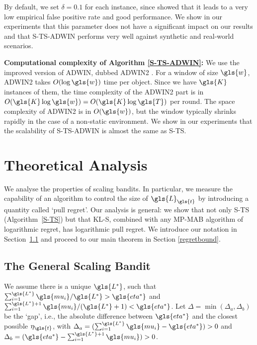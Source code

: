 By default, we set $\delta = 0.1$ for each instance, since \cite{DBLP:conf/sdm/BifetG07} showed that it leads to a very low empirical false positive rate and good performance. 
We show in our experiments that this parameter does not have a significant impact on our results and that S-TS-ADWIN performs very well against synthetic and real-world scenarios.  

\textbf{Computational complexity of Algorithm \ref{S-TS-ADWIN}:} We use the improved version of \gls{ADWIN}, dubbed ADWIN2 \cite{DBLP:conf/sdm/BifetG07}. For a window of size $\gls{w}$, ADWIN2 takes $O(\log \gls{w})$ time per object. Since we have $\gls{K}$ instances of them, the time complexity of the ADWIN2 part is in $O(\gls{K} \log \gls{w}) = O(\gls{K} \log \gls{T})$ per round. The space complexity of ADWIN2 is in $O(\gls{w})$, but the window typically shrinks rapidly in the case of a non-static environment. We show in our experiments that the scalability of \gls{S-TS-ADWIN} is almost the same as \gls{S-TS}.

\section{Theoretical Analysis}

We analyse the properties of scaling bandits. In particular, we measure the capability of an algorithm to control the size of $\gls{L}_{\gls{t}}$ by introducing a quantity called `pull regret'.
Our analysis is general: we show that not only \gls{S-TS} (Algo\-rithm~\ref{S-TS}) but that \gls{KL-S}, combined with any \gls{MP-MAB} algorithm of logarithmic regret, has logarithmic pull regret. 
We introduce our notation in Sec\-tion~\ref{subsec_theory_prelim} and proceed to our main theorem in Section \ref{regretbound}.

\subsection{The General Scaling Bandit}
\label{subsec_theory_prelim}
We assume there is a unique $\gls{L^*}$, such that 
$\sum_{i=1}^{\gls{L^*}} \gls{mu_i}/\gls{L^*} > \gls{eta^*}$ and $\sum_{i=1}^{\gls{L^*}+1} \gls{mu_i}/(\gls{L^*}+1) < \gls{eta^*}$. %
Let $\Delta = \min(\Delta_a, \Delta_b)$ be the `gap', i.e., the absolute difference between $\gls{eta^*}$ and the closest possible $\eta_{\gls{t}}$, with $\Delta_a = (\sum_{i=1}^{\gls{L^*}} \gls{mu_i}- \gls{eta^*}) > 0$ and $\Delta_b = (\gls{eta^*} - \sum_{i=1}^{\gls{L^*}+1} \gls{mu_i}) > 0$. 

